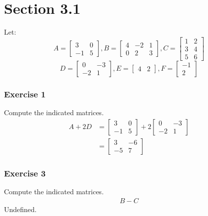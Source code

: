 \documentclass[letterpaper, 12pt]{math}
\begin{document}
\section*{Section 3.1}
Let:
\[ A = \begin{bmatrix}3 & 0 \\ -1 & 5\end{bmatrix},
  B = \begin{bmatrix}4 & -2 & 1 \\ 0 & 2 & 3\end{bmatrix},
  C = \begin{bmatrix}1 & 2 \\ 3 & 4 \\ 5 & 6\end{bmatrix} \]
\[ D = \begin{bmatrix}0 & -3 \\ -2 & 1\end{bmatrix},
  E = \begin{bmatrix}4 & 2\end{bmatrix},
  F = \begin{bmatrix}-1 \\ 2\end{bmatrix} \]

\subsubsection*{Exercise 1}
Compute the indicated matrices.
\begin{align*}
  A+2D &= \begin{bmatrix}
    3 & 0 \\
    -1 & 5
  \end{bmatrix}+2\begin{bmatrix}
    0 & -3 \\
    -2 & 1
  \end{bmatrix} \\
  &= \begin{bmatrix}
    3 & -6 \\
    -5 & 7
  \end{bmatrix}
\end{align*}

\subsubsection*{Exercise 3}
Compute the indicated matrices.
\begin{align*}
  B-C
\end{align*}
Undefined.
\end{document}
